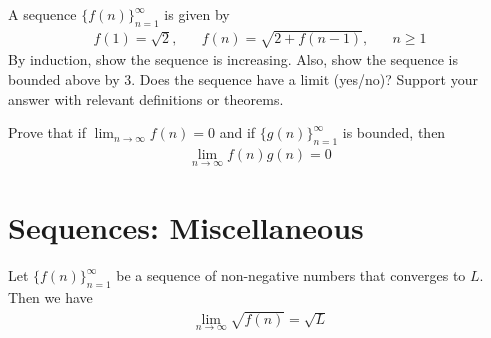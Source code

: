 \begin{exercise}
A sequence $\{f(n)\}_{n=1}^{\infty}$ is given by 
\begin{align*}
    f(1) = \sqrt{2}, \hspace{20pt} f(n) = \sqrt{2 + f(n-1)}, \hspace{20pt} n \geq 1
\end{align*}
By induction, show the sequence is increasing. Also, show the sequence is bounded above by $3$. Does the sequence have a limit (yes/no)? Support your answer with relevant definitions or theorems.
\end{exercise}

\begin{exercise}
Prove that if $\lim_{n \longrightarrow \infty} f(n) = 0$ and if $\{g(n)\}_{n=1}^{\infty}$ is bounded, then 
\begin{align*}
    \lim_{n \longrightarrow \infty} f(n)g(n) = 0
\end{align*}
\end{exercise}

\newpage
\section{Sequences: Miscellaneous} 

\begin{theorem}
Let $\{f(n)\}_{n=1}^{\infty}$ be a sequence of non-negative numbers that converges to $L$. Then we have 
\begin{align*}
    \lim_{n \longrightarrow \infty} \sqrt{f(n)} = \sqrt{L}
\end{align*}
\label{limit_passes_under_square_root}
\end{theorem}